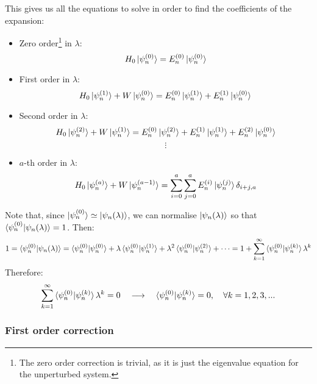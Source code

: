 This gives us all the equations to solve in order to find the coefficients of the expansion:
\begin{itemize}
    \item Zero order\footnote{The zero order correction is trivial, as it is just the eigenvalue equation for the unperturbed system.} in $\lambda$:
    \begin{equation}
        H_0\ket{\psi_n^{(0)}} = E_n^{(0)}\ket{\psi_n^{(0)}}
    \end{equation}
    \item First order in $\lambda$:
    \begin{equation} \label{first_order_correction_eig_eqn}
        H_0\ket{\psi_n^{(1)}} + W\ket{\psi_n^{(0)}} = E_n^{(0)}\ket{\psi_n^{(1)}} + E_n^{(1)}\ket{\psi_n^{(0)}}
    \end{equation}
    \item Second order in $\lambda$:
    \begin{equation} \label{second_order_correction_eig_eqn}
        H_0\ket{\psi_n^{(2)}} + W\ket{\psi_n^{(1)}} = E_n^{(0)}\ket{\psi_n^{(2)}} + E_n^{(1)}\ket{\psi_n^{(1)}} + E_n^{(2)}\ket{\psi_n^{(0)}}
    \end{equation}
    $$
    \vdots
    $$
    \item $a$-th order in $\lambda$:
    \begin{equation}
        H_0\ket{\psi_n^{(a)}} + W \ket{\psi_n^{(a-1)}} = \sum_{i=0}^{a}\sum_{j=0}^{a}E_n^{(i)}\ket{\psi_n^{(j)}}\delta_{i+j,a}
    \end{equation}
\end{itemize} 

Note that, since $\ket{\psi_n^{(0)}}\simeq \ket{\psi_n(\lambda)}$, we can normalise $\ket{\psi_n(\lambda)}$ so that $\braket{\psi_n^{(0)}|\psi_n(\lambda)} = 1$. Then:
\begin{equation}
    1 = \braket{\psi_n^{(0)}|\psi_n(\lambda)} = \braket{\psi_n^{(0)}|\psi_n^{(0)}} + \lambda \braket{\psi_n^{(0)}|\psi_n^{(1)}} + \lambda^2\braket{\psi_n^{(0)}|\psi_n^{(2)}} + \cdots = 1 + \sum_{k=1}^\infty \braket{\psi_n^{(0)}|\psi_n^{(k)}}\lambda^k
\end{equation}
Therefore:
\begin{equation} \label{orthonormal_perturbation_terms}
    \sum_{k=1}^\infty \braket{\psi_n^{(0)}|\psi_n^{(k)}}\lambda^k = 0 \quad\longrightarrow\quad \braket{\psi_n^{(0)}|\psi_n^{(k)}} = 0,\quad \forall k = 1, 2, 3, ...
\end{equation}


\subsubsection{First order correction}

